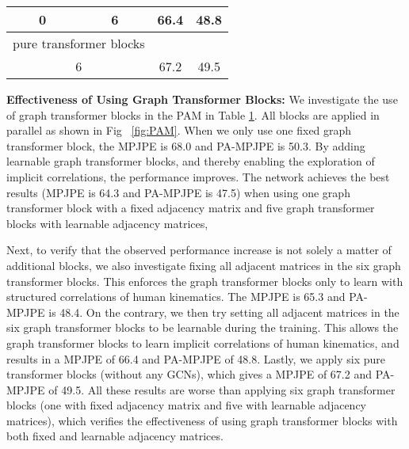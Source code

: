 \documentclass[sigconf]{acmart}
\begin{document}
\begin{table}[]
{\begin{tabular}{cccc}
0                                                                        & \multicolumn{1}{c|}{6}                                                                             & 66.4          & 48.8          \\ \hline
\multicolumn{2}{c|}{pure transformer blocks}                                                                                                                                  &           &      \\ \hline
\multicolumn{2}{c|}{6}                                                                                                                                                        & 67.2          & 49.5          \\ \hline
\end{tabular}
}
\label{tab: Ab_GCN}
\vspace{-10pt}
\end{table}

\textbf{Effectiveness of Using Graph Transformer Blocks:}
We investigate the use of graph transformer blocks in the PAM in Table \ref{tab: Ab_GCN}. All blocks are applied in parallel as shown in Fig ~\ref{fig:PAM}. When we only use one fixed graph transformer block, the MPJPE is 68.0 and PA-MPJPE is 50.3. 
By adding learnable graph transformer blocks, and thereby enabling the exploration of implicit correlations, the performance improves.
The network achieves the best results (MPJPE is 64.3 and PA-MPJPE is 47.5) when using one graph transformer block with a fixed adjacency matrix and five graph transformer blocks with learnable adjacency matrices, 

Next, to verify that the observed performance increase is not solely a matter of additional blocks, we also investigate fixing all adjacent matrices in the six graph transformer blocks. This enforces the graph transformer blocks only to learn with structured correlations of human kinematics. The MPJPE is 65.3 and PA-MPJPE is 48.4. On the contrary, we then try setting all adjacent matrices in the six graph transformer blocks to be learnable during the training.
This allows the graph transformer blocks to learn implicit correlations of human kinematics, and results in a MPJPE of 66.4 and PA-MPJPE of 48.8. Lastly, we apply six pure transformer blocks (without any GCNs), which gives a MPJPE of 67.2 and PA-MPJPE of 49.5. All these results are worse than applying six graph transformer blocks (one with fixed adjacency matrix and five with learnable adjacency matrices), which verifies the effectiveness of using graph transformer blocks with both fixed and learnable adjacency matrices.
\end{document}
